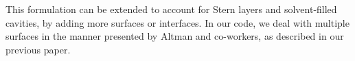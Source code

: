This formulation can be extended to account for Stern layers and solvent-filled cavities, by adding more surfaces or interfaces. In our code, we deal with multiple surfaces in the manner presented by Altman and co-workers,\cite{AltmanBardhanWhiteTidor09} as described in our previous paper.\cite{CooperBardhanBarba2013}



 \begin{comment}
 
Figure \ref{fig:molecule_surface_stern} shows a more interesting situation. There, the surface $\Gamma_3$ has a given potential $\phi_0$ with a Stern layer, and interacts with a molecule that has a pocket of solvent, where the linearized Poisson-Boltzmann equation is enforced. In this case, the derivation that led to Equation \eqref{eq:matrix_phi} yields
 
 \newpage
 

\end{comment}
